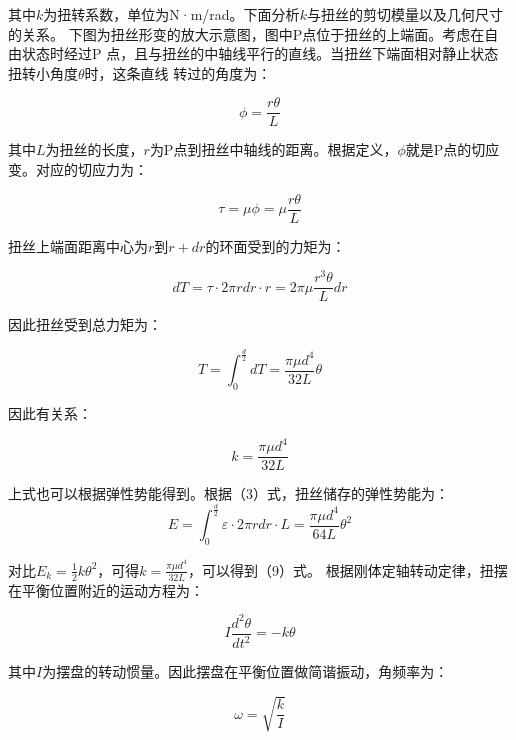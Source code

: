 \documentclass[UTF8]{ctexart}
\begin{document}
其中$k$为扭转系数，单位为N·m/rad。下面分析$k$与扭丝的剪切模量以及几何尺寸的关系。\newline
\noindent 下图为扭丝形变的放大示意图，图中P点位于扭丝的上端面。考虑在自由状态时经过P
点，且与扭丝的中轴线平行的直线。当扭丝下端面相对静止状态扭转小角度$\theta$时，这条直线
转过的角度为：

\begin{equation}
  \phi = \frac{r\theta}{L}
\end{equation}

其中$L$为扭丝的长度，$r$为P点到扭丝中轴线的距离。根据定义，$\phi$就是P点的切应变。对应的切应力为：

\begin{equation}
  \tau = \mu \phi = \mu \frac{r\theta}{L}
\end{equation}

扭丝上端面距离中心为$r$到$r+dr$的环面受到的力矩为：

\begin{equation}
  dT = \tau \cdot 2\pi r dr \cdot r = 2\pi \mu \frac{r^3\theta}{L} dr
\end{equation}

因此扭丝受到总力矩为： 

\begin{equation}
  T = \int_0^{\frac{d}{2}} dT = \frac{\pi \mu d^4}{32L} \theta
\end{equation}

因此有关系：

\begin{equation}
  k = \frac{\pi \mu d^4}{32L}
\end{equation}

上式也可以根据弹性势能得到。根据（3）式，扭丝储存的弹性势能为： 
\begin{equation}
  E = \int_0^{\frac{d}{2}} \varepsilon \cdot 2\pi r dr \cdot L = \frac{\pi \mu d^4}{64L} \theta^2
\end{equation}

对比$E_k = \frac{1}{2}k\theta^2$，可得$k = \frac{\pi \mu d^4}{32L}$，可以得到（9）式。
\noindent 根据刚体定轴转动定律，扭摆在平衡位置附近的运动方程为：

\begin{equation}
  I\frac{d^2\theta}{dt^2} = -k\theta
\end{equation}

其中$I$为摆盘的转动惯量。因此摆盘在平衡位置做简谐振动，角频率为：

\begin{equation}
  \omega = \sqrt{\frac{k}{I}}
\end{equation}
\end{document}
